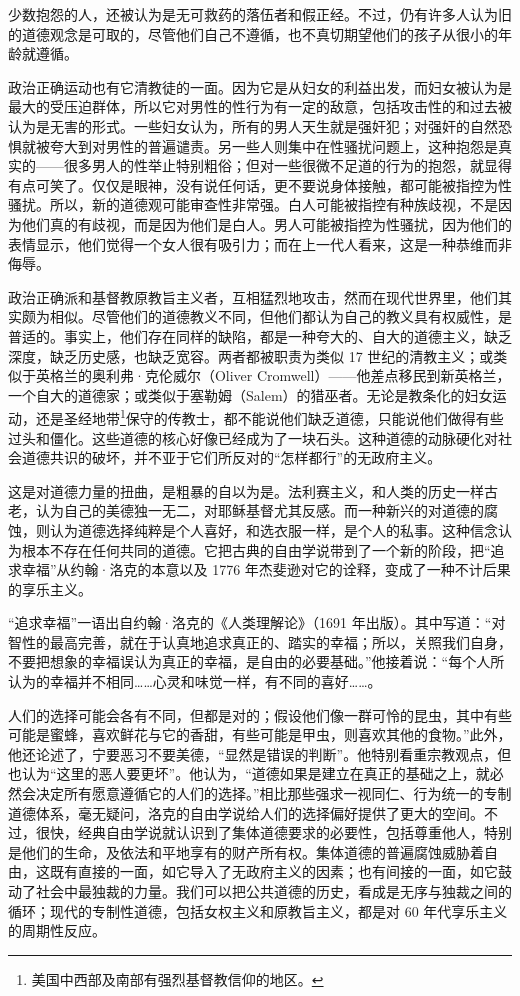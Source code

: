 少数抱怨的人，还被认为是无可救药的落伍者和假正经。不过，仍有许多人认为旧的道德观念是可取的，尽管他们自己不遵循，也不真切期望他们的孩子从很小的年龄就遵循。

政治正确运动也有它清教徒的一面。因为它是从妇女的利益出发，而妇女被认为是最大的受压迫群体，所以它对男性的性行为有一定的敌意，包括攻击性的和过去被认为是无害的形式。一些妇女认为，所有的男人天生就是强奸犯；对强奸的自然恐惧就被夸大到对男性的普遍谴责。另一些人则集中在性骚扰问题上，这种抱怨是真实的——很多男人的性举止特别粗俗；但对一些很微不足道的行为的抱怨，就显得有点可笑了。仅仅是眼神，没有说任何话，更不要说身体接触，都可能被指控为性骚扰。所以，新的道德观可能审查性非常强。白人可能被指控有种族歧视，不是因为他们真的有歧视，而是因为他们是白人。男人可能被指控为性骚扰，因为他们的表情显示，他们觉得一个女人很有吸引力；而在上一代人看来，这是一种恭维而非侮辱。

政治正确派和基督教原教旨主义者，互相猛烈地攻击，然而在现代世界里，他们其实颇为相似。尽管他们的道德教义不同，但他们都认为自己的教义具有权威性，是普适的。事实上，他们存在同样的缺陷，都是一种夸大的、自大的道德主义，缺乏深度，缺乏历史感，也缺乏宽容。两者都被职责为类似 17 世纪的清教主义；或类似于英格兰的奥利弗·克伦威尔（Oliver Cromwell）——他差点移民到新英格兰，一个自大的道德家；或类似于塞勒姆（Salem）的猎巫者。无论是教条化的妇女运动，还是圣经地带\footnote{美国中西部及南部有强烈基督教信仰的地区。}保守的传教士，都不能说他们缺乏道德，只能说他们做得有些过头和僵化。这些道德的核心好像已经成为了一块石头。这种道德的动脉硬化对社会道德共识的破坏，并不亚于它们所反对的“怎样都行”的无政府主义。

这是对道德力量的扭曲，是粗暴的自以为是。法利赛主义，和人类的历史一样古老，认为自己的美德独一无二，对耶稣基督尤其反感。而一种新兴的对道德的腐蚀，则认为道德选择纯粹是个人喜好，和选衣服一样，是个人的私事。这种信念认为根本不存在任何共同的道德。它把古典的自由学说带到了一个新的阶段，把“追求幸福”从约翰·洛克的本意以及 1776 年杰斐逊对它的诠释，变成了一种不计后果的享乐主义。

“追求幸福”一语出自约翰·洛克的《人类理解论》（1691 年出版）。其中写道：“对智性的最高完善，就在于认真地追求真正的、踏实的幸福；所以，关照我们自身，不要把想象的幸福误认为真正的幸福，是自由的必要基础。”他接着说：“每个人所认为的幸福并不相同……心灵和味觉一样，有不同的喜好……。

人们的选择可能会各有不同，但都是对的；假设他们像一群可怜的昆虫，其中有些可能是蜜蜂，喜欢鲜花与它的香甜，有些可能是甲虫，则喜欢其他的食物。”此外，他还论述了，宁要恶习不要美德，“显然是错误的判断”。他特别看重宗教观点，但也认为“这里的恶人要更坏”。他认为，“道德如果是建立在真正的基础之上，就必然会决定所有愿意遵循它的人们的选择。”相比那些强求一视同仁、行为统一的专制道德体系，毫无疑问，洛克的自由学说给人们的选择偏好提供了更大的空间。不过，很快，经典自由学说就认识到了集体道德要求的必要性，包括尊重他人，特别是他们的生命，及依法和平地享有的财产所有权。集体道德的普遍腐蚀威胁着自由，这既有直接的一面，如它导入了无政府主义的因素；也有间接的一面，如它鼓动了社会中最独裁的力量。我们可以把公共道德的历史，看成是无序与独裁之间的循环；现代的专制性道德，包括女权主义和原教旨主义，都是对 60 年代享乐主义的周期性反应。

